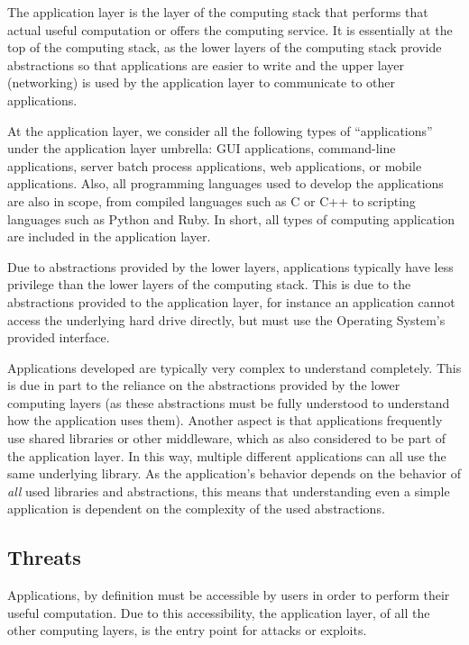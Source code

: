 \documentclass[11pt,letterpaper]{article}
\begin{document}
The application layer is the layer of the computing stack that
performs that actual useful computation or offers the computing
service. It is essentially at the top of the computing stack, as the
lower layers of the computing stack provide abstractions so that
applications are easier to write and the upper layer (networking) is
used by the application layer to communicate to other applications.

At the application layer, we consider all the following types of
``applications'' under the application layer umbrella: GUI
applications, command-line applications, server batch process
applications, web applications, or mobile applications. Also, all
programming languages used to develop the applications are also in
scope, from compiled languages such as C or C++ to scripting languages
such as Python and Ruby. In short, all types of computing application
are included in the application layer.

Due to abstractions provided by the lower layers, applications
typically have less privilege than the lower layers of the computing
stack. This is due to the abstractions provided to the application
layer, for instance an application cannot access the underlying hard
drive directly, but must use the Operating System's provided
interface.

Applications developed are typically very complex to understand
completely. This is due in part to the reliance on the abstractions
provided by the lower computing layers (as these abstractions must be
fully understood to understand how the application uses them). Another
aspect is that applications frequently use shared libraries or other
middleware, which as also considered to be part of the application
layer. In this way, multiple different applications can all use the
same underlying library. As the application's behavior depends on the
behavior of \emph{all} used libraries and abstractions, this means
that understanding even a simple application is dependent on the
complexity of the used abstractions.

\subsection{Threats}

Applications, by definition must be accessible by users in
order to perform their useful computation. Due to this accessibility,
the application layer, of all the other computing layers, is the entry
point for attacks or exploits. 
\end{document}
